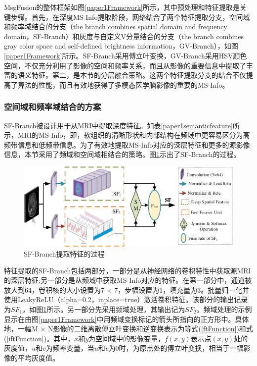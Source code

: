 MsgFusion的整体框架如图\ref{paper1Framework}所示，其中预处理和特征提取是关键步骤。首先，在深度MS-Info提取阶段，网络结合了两个特征提取分支，空间域和频率域结合的分支（the branch combines spatial domain and frequency domain，SF-Branch）和灰度与自定义V分量结合的分支（the branch combines gray color space
and self-defined brightness information，GV-Branch），如图\ref{paper1Framework}所示。SF-Branch采用傅立叶变换，GV-Branch采用HSV颜色空间，不仅充分利用了影像的空间和频率关系，而且从影像的重要信息中提取了丰富的语义特征。第二，是本节的分层融合策略。这两个特征提取分支的结合不仅提高了算法的性能，而且有效地获得了多模态医学脑影像的重要的MS-Info。

\subsubsection{空间域和频率域结合的方案}
SF-Branch被设计用于从MRI中提取深度特征。如表\ref{paper1semanticfeature}所示，MRI的MS-Info，即，软组织的清晰形状和内部结构在频域中更容易区分为高频带信息和低频带信息。为了有效地提取MS-Info对应的深层特征和更多的源影像信息，本节采用了频域和空间域相结合的策略。图\ref{paper1AS_Fu}示出了SF-Branch的过程。
    \begin{figure}[htb]
      \centering
          \includegraphics[width=0.9\columnwidth]{figs/paper1AS_Fu.pdf}
          \caption{SF-Branch提取特征的过程}\label{paper1AS_Fu}
     \end{figure}
     
特征提取的SF-Branch包括两部分，一部分是从神经网络的卷积特性中获取源MRI的深层特征;另一部分是从频域中获取MS-Info对应的特征。在第一部分中，通道被放大到64，卷积核的大小设置为7 × 7，步幅设置为1，填充量为3。批量归一化并使用LeakyReLU（alpha=0.2，inplace=true）激活卷积特征。该部分的输出记录为$SF_1$，如图\ref{paper1AS_Fu}所示。另一部分先采用频域处理，其输出记为$SF_2$。频域处理的示例显示在由图\ref{paper1Framework}中用频域变换标记的箭头所指向的正方形中。具体地，一幅M × N影像的二维离散傅立叶变换和逆变换表示为等式(\ref{ftFunction})和式(\ref{iftFunction})。其中，$x$和$y$为空间域中的影像变量，$f(x,y)$表示点$(x,y)$处的灰度值，$u$和$v$为频率变量，当$u$和$v$为0时，为原点处的傅立叶变换，相当于一幅影像的平均灰度值。

